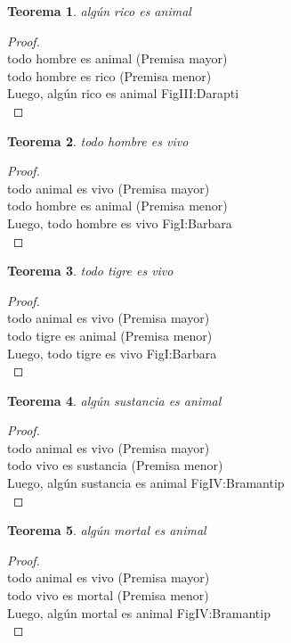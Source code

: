 ﻿\documentclass[12pt]{book}
\newtheorem{theorem}{Teorema}[chapter]
\newtheorem{proof}{Demostración}
\begin{document}
\begin{theorem}
algún rico es animal
\label{th: 17}
\end{theorem}\begin{proof}\\todo hombre es animal	 (Premisa mayor) \\todo hombre es rico	 (Premisa menor) \\Luego, algún rico es animal	FigIII:Darapti \\ \end{proof}
\begin{theorem}
todo hombre es vivo
\label{th: 18}
\end{theorem}\begin{proof}\\todo animal es vivo	 (Premisa mayor) \\todo hombre es animal	 (Premisa menor) \\Luego, todo hombre es vivo	FigI:Barbara \\ \end{proof}
\begin{theorem}
todo tigre es vivo
\label{th: 19}
\end{theorem}\begin{proof}\\todo animal es vivo	 (Premisa mayor) \\todo tigre es animal	 (Premisa menor) \\Luego, todo tigre es vivo	FigI:Barbara \\ \end{proof}
\begin{theorem}
algún sustancia es animal
\label{th: 20}
\end{theorem}\begin{proof}\\todo animal es vivo	 (Premisa mayor) \\todo vivo es sustancia	 (Premisa menor) \\Luego, algún sustancia es animal	FigIV:Bramantip \\ \end{proof}
\begin{theorem}
algún mortal es animal
\label{th: 21}
\end{theorem}\begin{proof}\\todo animal es vivo	 (Premisa mayor) \\todo vivo es mortal	 (Premisa menor) \\Luego, algún mortal es animal	FigIV:Bramantip \\ \end{proof}
\end{document}
